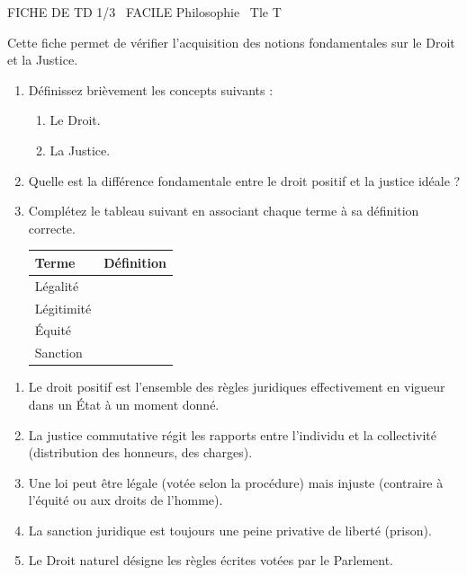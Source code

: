 \documentclass[11pt]{article}
\begin{document}
\begin{tcolorbox}[enhanced,colback=popink,colframe=popink,arc=10pt,boxrule=0pt,left=12pt,right=12pt,top=9pt,bottom=9pt]
{\color{white}\popxbold\small FICHE DE TD 1/3 \textbullet\ FACILE \hfill Philosophie \textbullet\ Tle T\par}
\end{tcolorbox}
\vspace{4pt}
Cette fiche permet de vérifier l'acquisition des notions fondamentales sur le Droit et la Justice.

\begin{exercice}
\begin{enumerate}
    \item Définissez brièvement les concepts suivants :
    \begin{enumerate}
        \item Le Droit.
        \item La Justice.
    \end{enumerate}
    \item Quelle est la différence fondamentale entre le \og droit positif \fg{} et la \og justice idéale \fg{} ?
    \item Complétez le tableau suivant en associant chaque terme à sa définition correcte.
    \begin{tabular}{|p{3.5cm}|p{11cm}|}
    \hline
    \textbf{Terme} & \textbf{Définition} \\ \hline
    Légalité &  \\ \hline
    Légitimité &  \\ \hline
    Équité &  \\ \hline
    Sanction &  \\ \hline
    \end{tabular}
\end{enumerate}
\end{exercice}

\begin{exercice}
\begin{enumerate}
    \item Le droit positif est l'ensemble des règles juridiques effectivement en vigueur dans un État à un moment donné.
    \item La justice commutative régit les rapports entre l'individu et la collectivité (distribution des honneurs, des charges).
    \item Une loi peut être légale (votée selon la procédure) mais injuste (contraire à l'équité ou aux droits de l'homme).
    \item La sanction juridique est toujours une peine privative de liberté (prison).
    \item Le Droit naturel désigne les règles écrites votées par le Parlement.
\end{enumerate}
\end{exercice}
\end{document}
